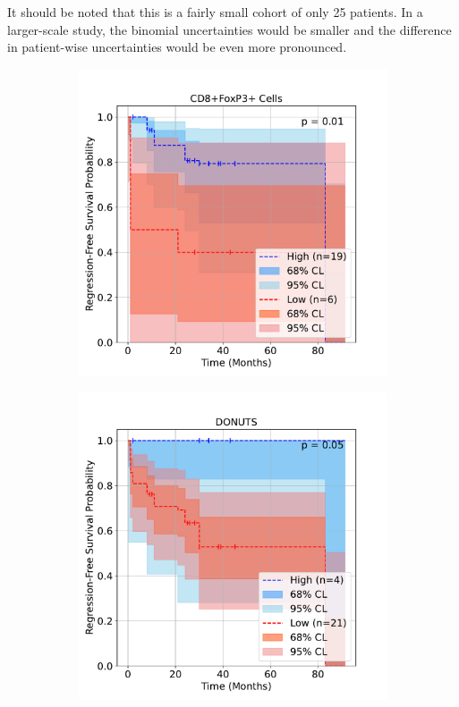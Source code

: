 \documentclass[article]{jss}
\begin{document}
It should be noted that this is a fairly small cohort of only 25 patients.  In a larger-scale study, the binomial uncertainties would be smaller and the difference in patient-wise uncertainties would be even more pronounced.

\begin{figure}[p]
  \newcommand{\spacebetweenrows}{1em}
  \newcommand{\figwidth}{0.36\textwidth}
  \centering
  \begin{subfigure}[t]{\figwidth}
    \centering
    \includegraphics[width=\linewidth]{lung_cells_km_RFS.pdf}
    \caption{\label{fig:lung-dataset-cells}}
  \end{subfigure}
  \begin{subfigure}[t]{\figwidth}
    \centering
    \includegraphics[width=\linewidth]{lung_donuts_km_RFS.pdf}

\end{subfigure}
\end{figure}
\end{document}
